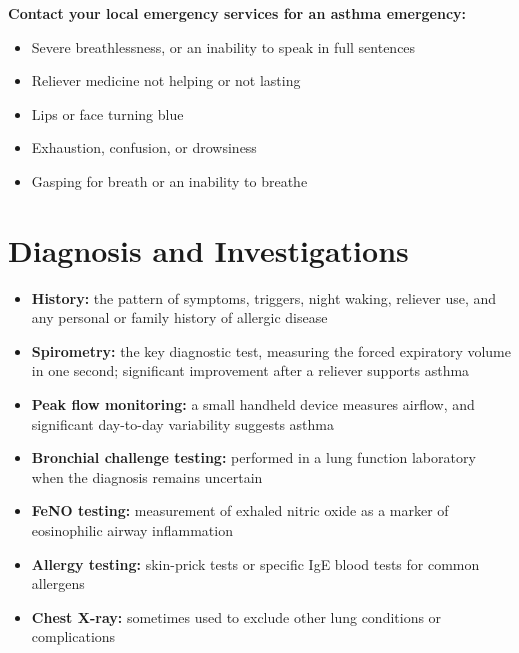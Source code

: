 \textbf{Contact your local emergency services for an asthma emergency:}
\begin{itemize}
    \item Severe breathlessness, or an inability to speak in full sentences
    \item Reliever medicine not helping or not lasting
    \item Lips or face turning blue
    \item Exhaustion, confusion, or drowsiness
    \item Gasping for breath or an inability to breathe
\end{itemize}

\section*{Diagnosis and Investigations}
\begin{itemize}
    \item \textbf{History:} the pattern of symptoms, triggers, night waking, reliever use, and any personal or family history of allergic disease
    \item \textbf{Spirometry:} the key diagnostic test, measuring the forced expiratory volume in one second; significant improvement after a reliever supports asthma
    \item \textbf{Peak flow monitoring:} a small handheld device measures airflow, and significant day-to-day variability suggests asthma
    \item \textbf{Bronchial challenge testing:} performed in a lung function laboratory when the diagnosis remains uncertain
    \item \textbf{FeNO testing:} measurement of exhaled nitric oxide as a marker of eosinophilic airway inflammation
    \item \textbf{Allergy testing:} skin-prick tests or specific IgE blood tests for common allergens
    \item \textbf{Chest X-ray:} sometimes used to exclude other lung conditions or complications
\end{itemize}

